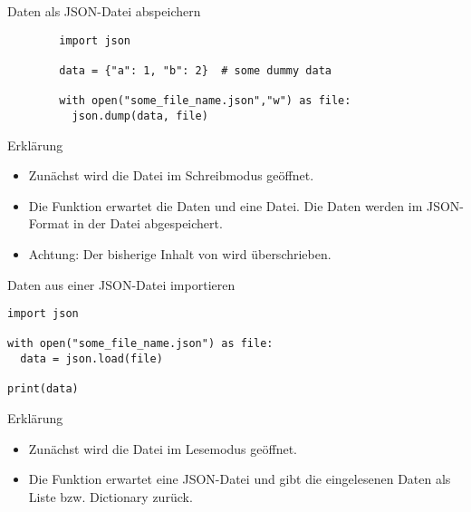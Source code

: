 \begin{fragile}
	\begin{block}{Daten als JSON-Datei abspeichern}
		\vspace{2pt}
		
		\begin{verbatim}
		import json 
		
		data = {"a": 1, "b": 2}  # some dummy data
		
		with open("some_file_name.json","w") as file:
		  json.dump(data, file)
		\end{verbatim}
		
		\pause
		
		\vspace{12pt}
		
		\begin{exampleblock}{Erklärung}
			\vspace{2pt}
			\begin{itemize}[<+->]
				\item Zunächst wird die Datei  im Schreibmodus geöffnet.  
				\item Die Funktion  erwartet die Daten und eine Datei. Die Daten werden im JSON-Format in der Datei abgespeichert. 
				\item Achtung: Der bisherige Inhalt von  wird überschrieben.  
			\end{itemize}
		\end{exampleblock}
	\end{block}
\end{fragile}


\begin{fragile}
\begin{block}{Daten aus einer JSON-Datei importieren}
\vspace{2pt}

\begin{verbatim}
import json 

with open("some_file_name.json") as file:
  data = json.load(file)
  
print(data)
\end{verbatim}

\pause

\vspace{12pt}

\begin{exampleblock}{Erklärung}
\vspace{2pt}
\begin{itemize}[<+->]
\item Zunächst wird die Datei  im Lesemodus geöffnet.  
\item Die Funktion  erwartet eine JSON-Datei und gibt die eingelesenen Daten als Liste bzw. Dictionary zurück.  
\end{itemize}
\end{exampleblock}
\end{block}
\end{fragile}



